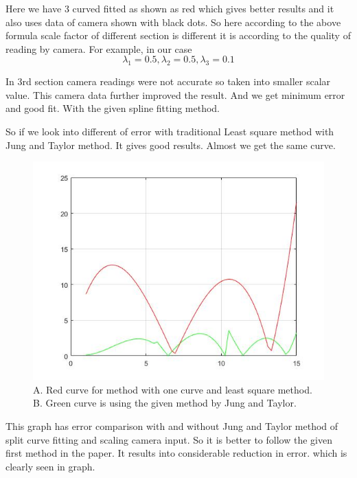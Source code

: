 Here we have 3 curved fitted as shown as red which gives better results and it also uses data of camera shown with black dots. So here according to the above formula scale factor of different section is different it is according to the quality of reading by camera.
For example, in our case 
\begin{equation}
\lambda_1=0.5 ,\lambda_2=0.5 ,\lambda_3=0.1
\end{equation}

In 3rd section camera readings were not accurate so taken into smaller scalar value. This camera data further improved the result. And we get minimum error and good fit. With the given spline fitting method.

So if we look into different of error with traditional Least square method with Jung and Taylor method. It gives good results. Almost we get the same curve.

\begin{figure}
\includegraphics{./figures/ErrorC.jpg}
\caption{A. Red curve for method with one curve and least square method. 
B. Green curve is using the given method by Jung and Taylor.}
\end{figure}

This graph has error comparison with and without Jung and Taylor method of split curve fitting and scaling camera input.
So it is better to follow the given first method in the paper. It results into considerable reduction in error. which is clearly seen in graph.
  